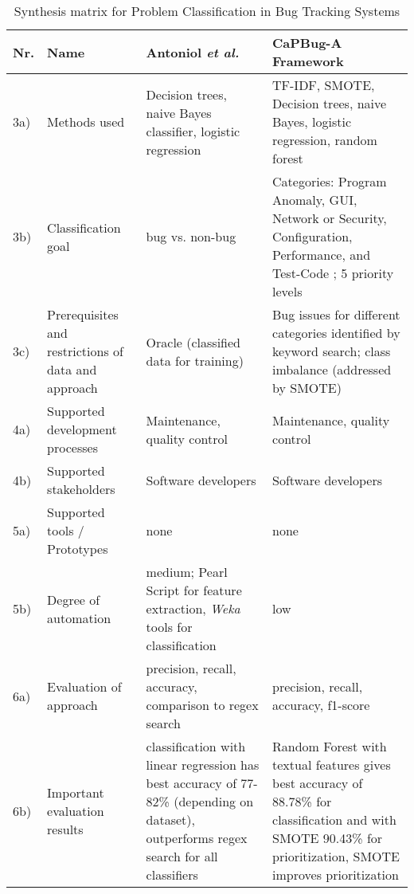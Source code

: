 \begin{table} [h] 
\centering
\begin{small}
\caption{Synthesis matrix for Problem Classification in Bug Tracking Systems}
\label{tab:Synthesis}
\setlength{\tabcolsep}{1em}

\renewcommand{\arraystretch}{1.5}
\begin{tabular}{ l| p{2.5cm}|p{4.4cm}|p{4.4cm}}
\hline
 \textbf{Nr.} & \textbf{ Name} & \textbf{Antoniol \textit{et al.} \cite{Antoniol2008}}& \textbf{CaPBug-A Framework \cite{Ahmed2021}}\\
\hline
 \hline	
 3a) & Methods used& Decision trees, naive Bayes classifier, logistic regression& TF-IDF, SMOTE, Decision trees, naive Bayes, logistic regression, random forest\\
 \hline
  3b) & Classification goal  & bug vs. non-bug & Categories: Program Anomaly, GUI, Network or Security, Configuration, Performance, and Test-Code ; 5 priority levels\\
 \hline
  3c) & Prerequisites and restrictions of data and approach & Oracle (classified data for training) & Bug issues for different categories identified by keyword search; class imbalance (addressed by SMOTE)\\
 \hline
4a) & Supported development processes & Maintenance, quality control& Maintenance, quality control\\
 \hline
4b) & Supported stakeholders & Software developers & Software developers \\
 \hline
5a) & Supported tools / Prototypes & none & none\\
 \hline
5b) & Degree of automation & medium; Pearl Script for feature extraction, \textit{Weka} tools for classification & low\\
 \hline
6a) & Evaluation of approach & precision, recall, accuracy, comparison to regex search & precision, recall, accuracy, f1-score\\
 \hline
6b) & Important evaluation results & classification with linear regression has best accuracy of 77-82\% (depending on dataset), outperforms regex search for all classifiers& Random Forest with textual features gives best accuracy of 88.78\% for classification and with SMOTE 90.43\% for prioritization, SMOTE improves prioritization\\
 \hline
\end{tabular}
\end{small}
\end{table}


